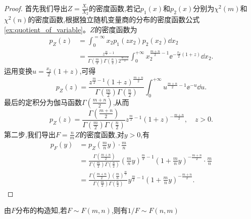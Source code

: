 \begin{proof}
    首先我们导出$Z=\frac{X_1}{X_2}$的密度函数,若记$p_1(x)$和$p_2(x)$分别为$\chi^2(m)$和$\chi^2(n)$的密度函数,根据独立随机变量商的分布的密度函数公式\ref{ex:quotient_of_variable}。$Z$的密度函数为
    \begin{align*}
        p_Z(z) & =\int_0^{=\infty}x_2p_1(zx_2)p_2(x_2)\dd x_2                                                                                                                                       \\
               & =\frac{z^{\frac{m}{2}-1}}{\Gamma \left( \frac{m}{2} \right) \Gamma \left( \frac{n}{2} \right) 2^{\frac{m+n}{2}}}\int_0^{+\infty}x_2^{\frac{m+n}2-1}\ee^{-\frac{x_2}2(1+z)}\dd x_2.
    \end{align*}
    运用变换$u=\frac{x_2}2(1+z)$,可得
    \[p_Z(z)=\frac{z^{\frac{m}{2}-1}\left( 1+z \right) ^{\frac{m+n}{2}}}{\Gamma \left( \frac{m}{2} \right) \Gamma \left( \frac{n}{2} \right)}\int_0^{+\infty}u^{\frac{m+n}2-1}\ee^{-u}\dd u.\]
    最后的定积分为伽马函数$\Gamma\left(\frac{m+n}2\right)$,从而
    \[
        p_Z\left( z \right) =\frac{\Gamma \left( \frac{m+n}{2} \right)}{\Gamma \left( \frac{m}{2} \right) \Gamma \left( \frac{n}{2} \right)}z^{\frac{m}{2}-1}\left( 1+z \right) ^{-\frac{m+n}{2}},\quad z>0.
    \]
    第二步,我们导出$F=\frac nm Z$的密度函数,对$y>0$,有
    \begin{align*}
        p_F\left( y \right) & =p_Z\left( \frac{m}{n}y \right) \cdot \frac{m}{n}                                                                                                                                                                            \\
                            & =\frac{\Gamma \left( \frac{m+n}{2} \right)}{\Gamma \left( \frac{m}{2} \right) \Gamma \left( \frac{n}{2} \right)}\left( \frac{m}{n}y \right) ^{\frac{m}{2}-1}\left( 1+\frac{m}{n}y \right) ^{-\frac{m+n}{2}}\cdot \frac{m}{n} \\
                            & =\frac{\Gamma \left( \frac{m+n}{2} \right) \left( \frac{m}{n} \right) ^{\frac{m}{2}}}{\Gamma \left( \frac{m}{2} \right) \Gamma \left( \frac{n}{2} \right)}y^{\frac{m}{2}-1}\left( 1+\frac{m}{n}y \right) ^{-\frac{m+n}{2}}.
    \end{align*}
\end{proof}

\begin{remark}
    由$F$分布的构造知,若$F\sim F(m,n)$,则有$1/F\sim F(n,m)$
\end{remark}

